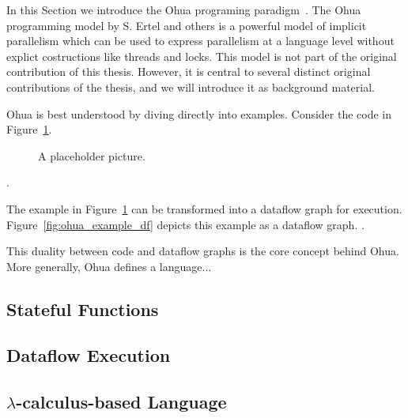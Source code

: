 In this Section we introduce the Ohua programing paradigm~\cite{ertel_phdthesis}.
The Ohua programming model by S. Ertel and others is a powerful model of implicit parallelism which can be used to express parallelism at a language level without explict costructions like threads and locks. 
This model is not part of the original contribution of this thesis. However, it is central to several distinct original contributions of the thesis, and we will introduce it as background material.

Ohua is best understood by diving directly into examples. Consider the code in Figure~\ref{fig:ohua_example}.
\begin{figure}[h]
	\centering
   \resizebox{0.55\textwidth}{!}{}
	\caption{A placeholder picture.}
	\label{fig:ohua_example}
\end{figure}

\blindtext[5]
.

The example in Figure~\ref{fig:ohua_example} can be transformed into a dataflow graph for execution. Figure~\ref{fig:ohua_example_df} depicts this example as a dataflow graph.
\blindtext[5]
.

This duality between code and dataflow graphs is the core concept behind Ohua. More generally, Ohua defines a language...
\blindtext[5]

\subsection{Stateful Functions}
\Blindtext[5]

\subsection{Dataflow Execution}
\Blindtext[5]

\subsection{$\lambda$-calculus-based Language}
\Blindtext[5]
